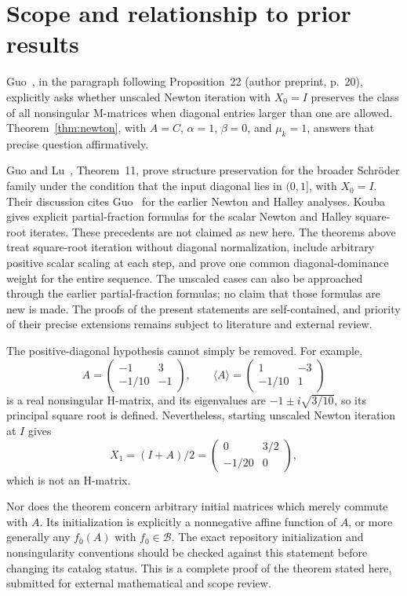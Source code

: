 \documentclass[11pt]{article}
\newcommand{\comp}[1]{\langle #1\rangle}
\begin{document}
\section{Scope and relationship to prior results}
Guo~\cite{G}, in the paragraph following Proposition~22 (author preprint, p.~20), explicitly asks whether unscaled Newton iteration with $X_0=I$ preserves the class of all nonsingular M-matrices when diagonal entries larger than one are allowed. Theorem~\ref{thm:newton}, with $A=C$, $\alpha=1$, $\beta=0$, and $\mu_k=1$, answers that precise question affirmatively.

Guo and Lu~\cite{GL}, Theorem~11, prove structure preservation for the broader Schr\"oder family under the condition that the input diagonal lies in $(0,1]$, with $X_0=I$. Their discussion cites Guo~\cite{G} for the earlier Newton and Halley analyses. Kouba~\cite{K} gives explicit partial-fraction formulas for the scalar Newton and Halley square-root iterates. These precedents are not claimed as new here. The theorems above treat square-root iteration without diagonal normalization, include arbitrary positive scalar scaling at each step, and prove one common diagonal-dominance weight for the entire sequence. The unscaled cases can also be approached through the earlier partial-fraction formulas; no claim that those formulas are new is made. The proofs of the present statements are self-contained, and priority of their precise extensions remains subject to literature and external review.

The positive-diagonal hypothesis cannot simply be removed. For example,
\[
A=\begin{pmatrix}-1&3\\-1/10&-1\end{pmatrix},\qquad
\comp A=\begin{pmatrix}1&-3\\-1/10&1\end{pmatrix}
\]
is a real nonsingular H-matrix, and its eigenvalues are $-1\pm i\sqrt{3/10}$, so its principal square root is defined. Nevertheless, starting unscaled Newton iteration at $I$ gives
\[
X_1=(I+A)/2=\begin{pmatrix}0&3/2\\-1/20&0\end{pmatrix},
\]
which is not an H-matrix.

Nor does the theorem concern arbitrary initial matrices which merely commute with $A$. Its initialization is explicitly a nonnegative affine function of $A$, or more generally any $f_0(A)$ with $f_0\in\mathcal B$. The exact repository initialization and nonsingularity conventions should be checked against this statement before changing its catalog status. This is a complete proof of the theorem stated here, submitted for external mathematical and scope review.
\end{document}
